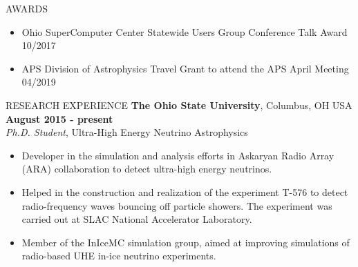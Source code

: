 \documentclass{resume} %
\begin{document}
\begin{rSection}{AWARDS}
 \begin{itemize}
 \item Ohio SuperComputer Center Statewide Users Group Conference Talk Award \hfill 10/2017
 \item APS Division of Astrophysics Travel Grant to attend the APS April Meeting \hfill 04/2019

 \end{itemize}
\end{rSection}

\begin{rSection}{RESEARCH EXPERIENCE}
{\bf The Ohio State University}, Columbus, OH USA \hfill {\bf August 2015 - present} \\
 {\em Ph.D. Student}, Ultra-High Energy Neutrino Astrophysics
\begin{itemize}
\vspace*{.05in}
\item Developer in the simulation and analysis efforts in Askaryan Radio Array (ARA) collaboration to detect ultra-high energy neutrinos.
\item Helped in the construction and realization of the experiment T-576 to detect radio-frequency waves bouncing off particle showers. The experiment was carried out at SLAC National Accelerator Laboratory.
\item Member of the InIceMC simulation group, aimed at improving simulations of radio-based UHE in-ice neutrino experiments. 

\end{itemize}

\end{rSection}
\end{document}
